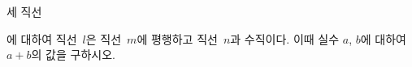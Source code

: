 세 직선 \par\smallskip{}\par\smallskip\noindent 에 대하여 직선~$l$은 직선~$m$에 평행하고 직선~$n$과 수직이다. 이때 실수 $a$, $b$에 대하여 $a+b$의 값을 구하시오.
